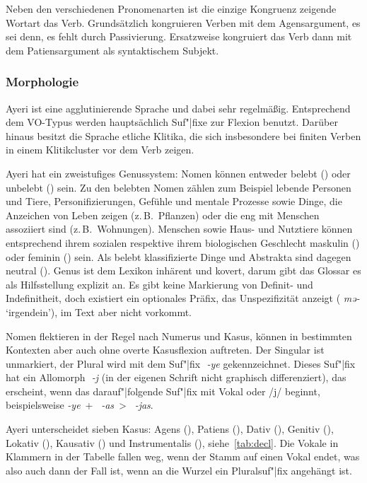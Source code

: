 \documentclass[
	12pt,
	ngerman,
]{scrartcl}
\newcommand{\zwsp}{\mbox{​}} %
\newcommand{\rayr}[2]{\zwsp\smash{{\Tagati #1}} \emph{#2}} %
\newcommand{\xayr}[3]{\zwsp\smash{\Tagati #1} \emph{#2} `#3'} %
\begin{document}
Neben den verschiedenen Pronomenarten ist die einzige Kongruenz zeigende
Wortart das Verb. Grundsätzlich kongruieren Verben mit dem Agensargument, es
sei denn, es fehlt durch
Passivierung. Ersatzweise kongruiert das Verb dann mit dem Patiensargument als
syntaktischem Subjekt.

\subsubsection{Morphologie}

Ayeri ist eine agglutinierende Sprache und dabei sehr regelmäßig. Entsprechend
dem VO-Typus werden hauptsächlich Suf"|fixe zur Flexion benutzt.
Darüber hinaus besitzt die Sprache etliche Klitika, die sich insbesondere bei
finiten Verben in einem Klitikcluster vor dem Verb zeigen.

\label{subsubsec:nom}

Ayeri hat ein zweistufiges Genussystem: Nomen können entweder belebt (\Anim)
oder unbelebt (\Inan) sein. Zu den belebten Nomen zählen zum Beispiel lebende
Personen und Tiere, Personifizierungen, Gefühle und mentale Prozesse sowie
Dinge, die Anzeichen von Leben zeigen (z.\,B.~Pflanzen) oder die eng mit
Menschen assoziiert sind (z.\,B.~Wohnungen). Menschen sowie Haus- und Nutztiere
können entsprechend ihrem sozialen respektive ihrem biologischen Geschlecht
maskulin (\M) oder feminin (\F) sein. Als belebt klassifizierte Dinge und
Abstrakta sind dagegen neutral (\N). Genus ist dem Lexikon inhärent und kovert,
darum gibt das Glossar es als Hilfsstellung explizit an. Es gibt keine
Markierung von Definit- und Indefinitheit, doch existiert ein optionales Präfix,
das Unspezifizität anzeigt (\xayr{me/}{mə-}{irgendein}), im Text aber nicht
vorkommt.

Nomen flektieren in der Regel nach Numerus und Kasus, können in bestimmten
Kontexten aber auch ohne overte Kasusflexion auftreten. Der Singular ist
unmarkiert, der Plural wird mit dem Suf"|fix \rayr{/ye}{-ye} gekennzeichnet.
Dieses Suf"|fix hat ein Allomorph \rayr{/ye}{-j} (in der eigenen Schrift nicht
graphisch differenziert), das erscheint, wenn das darauf"|folgende Suf"|fix mit
Vokal oder /j/ beginnt, beispielsweise
\rayr{/ye}{-ye}~+~\rayr{/AsF}{-as}~>~\rayr{/ye\_asF}{-jas}.

Ayeri unterscheidet sieben Kasus: Agens (\Aarg), Patiens (\Parg), Dativ (\Dat),
Genitiv (\Gen), Lokativ (\Loc), Kausativ (\Caus) und Instrumentalis (\Ins),
siehe~\cref{tab:decl}. Die Vokale in Klammern in der Tabelle fallen weg, wenn
der Stamm auf einen Vokal endet, was also auch dann der Fall ist, wenn an die
Wurzel ein Pluralsuf"|fix angehängt ist.
\end{document}
